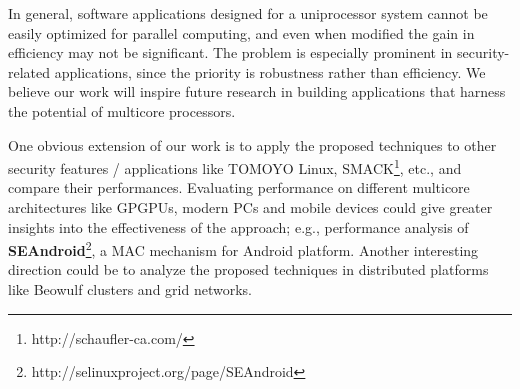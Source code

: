 \documentclass[conference]{IEEEtran}
\begin{document}
In general, software applications designed for a uniprocessor system
cannot be easily optimized for parallel computing, and even when
modified the gain in efficiency may not be significant.  The problem
is especially prominent in security-related applications, since the
priority is robustness rather than efficiency.  We believe our work
will inspire future research in building applications that harness the
potential of multicore processors.

One obvious extension of our work is to apply the proposed techniques
to other security features / applications like TOMOYO Linux,
SMACK\footnote{http://schaufler-ca.com/}, etc., and compare their
performances.  Evaluating performance on different multicore
architectures like GPGPUs, modern PCs and mobile devices could give
greater insights into the effectiveness of the approach; e.g.,
performance analysis of
\textbf{SEAndroid}\footnote{http://selinuxproject.org/page/SEAndroid},
a MAC mechanism for Android platform.  Another interesting direction
could be to analyze the proposed techniques in distributed platforms
like Beowulf clusters and grid networks.



\end{document}

